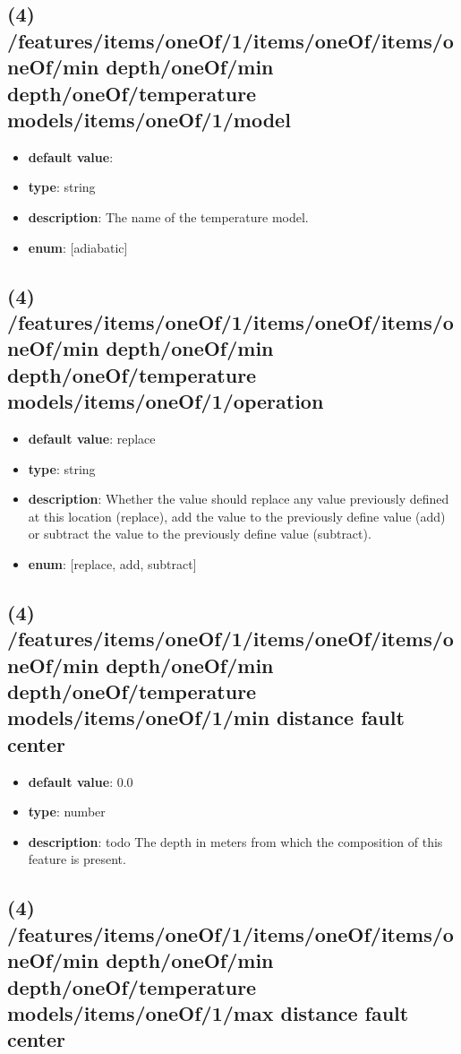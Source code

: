 \subsection{(4) /features/items/oneOf/1/items/oneOf/items/oneOf/min depth/oneOf/min depth/oneOf/temperature models/items/oneOf/1/model}
\begin{itemize}[leftmargin=4em]\item {\bf default value}: 
\item {\bf type}: string
\item {\bf description}: The name of the temperature model.
\item {\bf enum}: [adiabatic]\end{itemize}\subsection{(4) /features/items/oneOf/1/items/oneOf/items/oneOf/min depth/oneOf/min depth/oneOf/temperature models/items/oneOf/1/operation}
\begin{itemize}[leftmargin=4em]\item {\bf default value}: replace
\item {\bf type}: string
\item {\bf description}: Whether the value should replace any value previously defined at this location (replace), add the value to the previously define value (add) or subtract the value to the previously define value (subtract).
\item {\bf enum}: [replace, add, subtract]\end{itemize}\subsection{(4) /features/items/oneOf/1/items/oneOf/items/oneOf/min depth/oneOf/min depth/oneOf/temperature models/items/oneOf/1/min distance fault center}
\begin{itemize}[leftmargin=4em]\item {\bf default value}: 0.0
\item {\bf type}: number
\item {\bf description}: todo The depth in meters from which the composition of this feature is present.
\end{itemize}\subsection{(4) /features/items/oneOf/1/items/oneOf/items/oneOf/min depth/oneOf/min depth/oneOf/temperature models/items/oneOf/1/max distance fault center}
